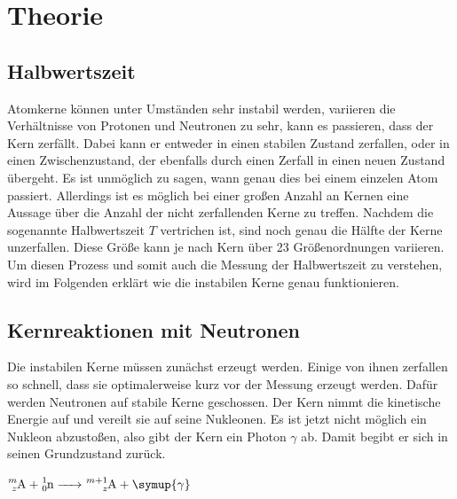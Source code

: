 \section{Theorie}
\label{sec:Theorie}




\subsection{Halbwertszeit}
\label{ssec:t1}

Atomkerne können unter Umständen sehr instabil werden, variieren die Verhältnisse von Protonen und Neutronen zu sehr, kann es passieren, dass der Kern zerfällt.
Dabei kann er entweder in einen stabilen Zustand zerfallen, oder in einen Zwischenzustand, der ebenfalls durch einen Zerfall in einen neuen Zustand übergeht.
Es ist unmöglich zu sagen, wann genau dies bei einem einzelen Atom passiert.
Allerdings ist es möglich bei einer großen Anzahl an Kernen eine Aussage über die Anzahl der nicht zerfallenden Kerne zu treffen.
Nachdem die sogenannte Halbwertszeit $T$ vertrichen ist, sind noch genau die Hälfte der Kerne unzerfallen.
Diese Größe kann je nach Kern über 23 Größenordnungen variieren.
Um diesen Prozess und somit auch die Messung der Halbwertszeit zu verstehen, wird im Folgenden erklärt wie die instabilen Kerne genau funktionieren.

\subsection{Kernreaktionen mit Neutronen}
\label{ssec:t2}

Die instabilen Kerne müssen zunächst erzeugt werden.
Einige von ihnen zerfallen so schnell, dass sie optimalerweise kurz vor der Messung erzeugt werden.
Dafür werden Neutronen auf stabile Kerne geschossen.
Der Kern nimmt die kinetische Energie auf und vereilt sie auf seine Nukleonen. 
Es ist jetzt nicht möglich ein Nukleon abzustoßen, also gibt der Kern ein Photon $\gamma$ ab.
Damit begibt er sich in seinen Grundzustand zurück. 

$\ce{^{m}_zA + ^{1}_0n -> ^{m+1}_zA + \symup{\gamma}}$

